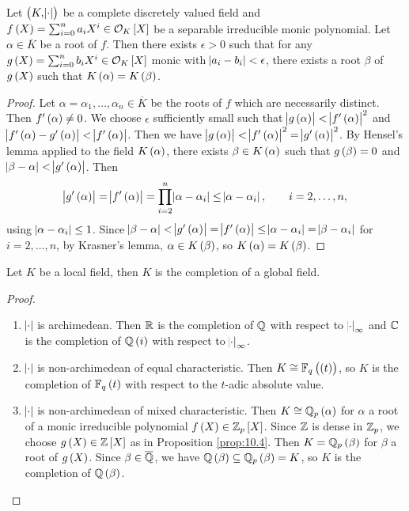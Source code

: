 \begin{proposition}
\label{prop:10.4}
Let $ \br{K, \abs{\cdot}} $ be a complete discretely valued field and $ f\br{X} = \sum_{i = 0}^n a_iX^i \in \OOO_K\sbr{X} $ be a separable irreducible monic polynomial. Let $ \alpha \in \overline{K} $ be a root of $ f $. Then there exists $ \epsilon > 0 $ such that for any $ g\br{X} = \sum_{i = 0}^n b_iX^i \in \OOO_K\sbr{X} $ monic with $ \abs{a_i - b_i} < \epsilon $, there exists a root $ \beta $ of $ g\br{X} $ such that $ K\br{\alpha} = K\br{\beta} $.
\end{proposition}

\begin{proof}
Let $ \alpha = \alpha_1, \dots, \alpha_n \in \overline{K} $ be the roots of $ f $ which are necessarily distinct. Then $ f'\br{\alpha} \ne 0 $. We choose $ \epsilon $ sufficiently small such that $ \abs{g\br{\alpha}} < \abs{f'\br{\alpha}}^2 $ and $ \abs{f'\br{\alpha} - g'\br{\alpha}} < \abs{f'\br{\alpha}} $. Then we have $ \abs{g\br{\alpha}} < \abs{f'\br{\alpha}}^2 = \abs{g'\br{\alpha}}^2 $. By Hensel's lemma applied to the field $ K\br{\alpha} $, there exists $ \beta \in K\br{\alpha} $ such that $ g\br{\beta} = 0 $ and $ \abs{\beta - \alpha} < \abs{g'\br{\alpha}} $. Then
$$ \abs{g'\br{\alpha}} = \abs{f'\br{\alpha}} = \prod_{i = 2}^n \abs{\alpha - \alpha_i} \le \abs{\alpha - \alpha_i}, \qquad i = 2, \dots, n, $$
using $ \abs{\alpha - \alpha_i} \le 1 $. Since $ \abs{\beta - \alpha} < \abs{g'\br{\alpha}} = \abs{f'\br{\alpha}} \le \abs{\alpha - \alpha_i} = \abs{\beta - \alpha_i} $ for $ i = 2, \dots, n $, by Krasner's lemma, $ \alpha \in K\br{\beta} $, so $ K\br{\alpha} = K\br{\beta} $.
\end{proof}

\begin{theorem}
Let $ K $ be a local field, then $ K $ is the completion of a global field.
\end{theorem}

\begin{proof}
\hfill
\begin{enumerate}[leftmargin=0.5in, label=Case \arabic*.]
\item $ \abs{\cdot} $ is archimedean. Then $ \mathbb{R} $ is the completion of $ \mathbb{Q} $ with respect to $ \abs{\cdot}_\infty $ and $ \mathbb{C} $ is the completion of $ \QQ\br{i} $ with respect to $ \abs{\cdot}_\infty $.
\item $ \abs{\cdot} $ is non-archimedean of equal characteristic. Then $ K \cong \FF_q\br{\br{t}} $, so $ K $ is the completion of $ \FF_q\br{t} $ with respect to the $ t $-adic absolute value.
\item $ \abs{\cdot} $ is non-archimedean of mixed characteristic. Then $ K \cong \QQ_p\br{\alpha} $ for $ \alpha $ a root of a monic irreducible polynomial $ f\br{X} \in \ZZ_p\sbr{X} $. Since $ \mathbb{Z} $ is dense in $ \mathbb{Z}_p $, we choose $ g\br{X} \in \ZZ\sbr{X} $ as in Proposition \ref{prop:10.4}. Then $ K = \QQ_p\br{\beta} $ for $ \beta $ a root of $ g\br{X} $. Since $ \beta \in \overline{\mathbb{Q}} $, we have $ \QQ\br{\beta} \subseteq \QQ_p\br{\beta} = K $, so $ K $ is the completion of $ \QQ\br{\beta} $.
\end{enumerate}
\end{proof}

